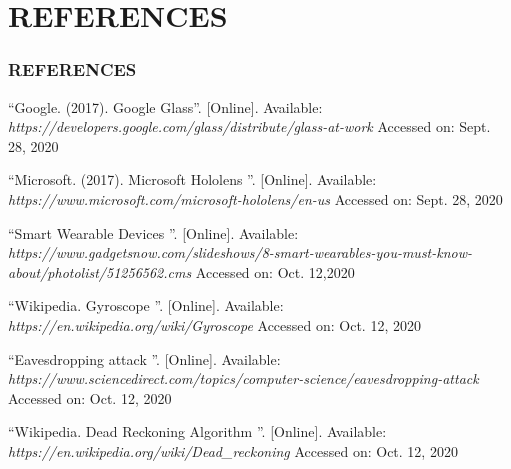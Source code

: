 \documentclass{beamer}
\begin{document}
\section{REFERENCES}
\begin{frame}[allowframebreaks]
\frametitle{REFERENCES}
\begin{enumerate}
\tiny




 	 {{\textquotedblleft Google. (2017). Google Glass\textquotedblright}. [Online]. Available:\\ \textit{https://developers.google.com/glass/distribute/glass-at-work} Accessed on: Sept. 28, 2020}

 {\textquotedblleft  Microsoft. (2017). Microsoft Hololens \textquotedblright . [Online]. Available:\\ \textit{https://www.microsoft.com/microsoft-hololens/en-us} Accessed on: Sept. 28, 2020}

 	 {{\textquotedblleft Smart Wearable Devices \textquotedblright}. [Online]. Available:\\ \textit{https://www.gadgetsnow.com/slideshows/8-smart-wearables-you-must-know-about/photolist/51256562.cms} Accessed on: Oct. 12,2020}

 	 {{\textquotedblleft Wikipedia. Gyroscope \textquotedblright}. [Online]. Available:\\ \textit{https://en.wikipedia.org/wiki/Gyroscope} Accessed on: Oct. 12, 2020}

 	 {{\textquotedblleft Eavesdropping attack \textquotedblright}. [Online]. Available:\\ \textit{https://www.sciencedirect.com/topics/computer-science/eavesdropping-attack} \newline Accessed on: Oct. 12, 2020}

 	 {{\textquotedblleft Wikipedia. Dead Reckoning Algorithm \textquotedblright}. [Online]. Available:\\ \textit{https://en.wikipedia.org/wiki/Dead\_reckoning}  Accessed  on: Oct. 12, 2020}


\end{enumerate}
\end{frame}
\end{document}
